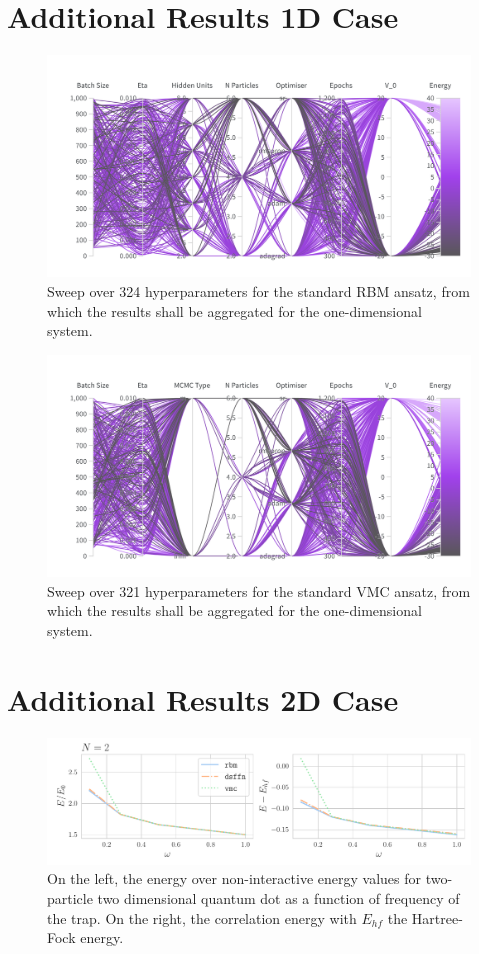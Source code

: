 \section{Additional Results 1D Case}\label{apendix:more_results_1d}

\begin{figure}[H]
    \centering
    \includegraphics[width=0.8\linewidth]{Chapters/Results/N2/rbm_sweep.png}
    \caption{Sweep over 324 hyperparameters for the standard RBM ansatz, from which the results shall be aggregated for the one-dimensional system.}
    \label{fig:vmc_complete_sweep}
\end{figure}
\begin{figure}[H]
    \centering
    \includegraphics[width=0.8\linewidth]{Chapters/Results/N2/vmc_complete.png}
    \caption{Sweep over 321 hyperparameters for the standard VMC ansatz, from which the results shall be aggregated for the one-dimensional system.}
    \label{fig:rbm_complete_sweep}
\end{figure}

\section{Additional Results 2D Case}\label{apendix:more_results_2d}
\begin{figure}[H]
    \centering
    \includegraphics[width=\textwidth]{Chapters/Results/dots/total_energy_vs_omega_n2.pdf}
    \caption{On the left, the energy over non-interactive energy values for two-particle two dimensional quantum dot as a function of frequency of the trap. On the right, the correlation energy with $E_{hf}$ the Hartree-Fock energy.}
\end{figure}


